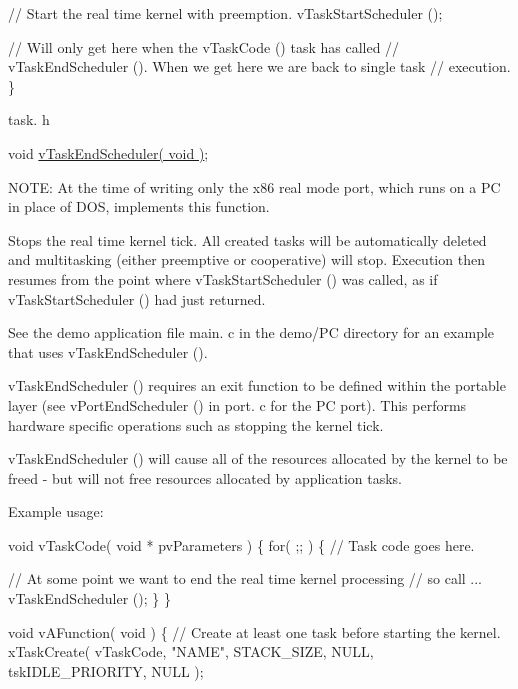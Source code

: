 \begin{DoxyPre}  // Start the real time kernel with preemption.
  vTaskStartScheduler ();\end{DoxyPre}



\begin{DoxyPre}  // Will only get here when the vTaskCode () task has called
  // vTaskEndScheduler ().  When we get here we are back to single task
  // execution.
\}
\end{DoxyPre}


task. h 
\begin{DoxyPre}void \hyperlink{externals_2freertos_2include_2task_8h_a1651e13c7ccd6273f53a62425ec79a15}{vTaskEndScheduler( void )};\end{DoxyPre}


N\+O\+TE\+: At the time of writing only the x86 real mode port, which runs on a PC in place of D\+OS, implements this function.

Stops the real time kernel tick. All created tasks will be automatically deleted and multitasking (either preemptive or cooperative) will stop. Execution then resumes from the point where v\+Task\+Start\+Scheduler () was called, as if v\+Task\+Start\+Scheduler () had just returned.

See the demo application file main. c in the demo/\+PC directory for an example that uses v\+Task\+End\+Scheduler ().

v\+Task\+End\+Scheduler () requires an exit function to be defined within the portable layer (see v\+Port\+End\+Scheduler () in port. c for the PC port). This performs hardware specific operations such as stopping the kernel tick.

v\+Task\+End\+Scheduler () will cause all of the resources allocated by the kernel to be freed -\/ but will not free resources allocated by application tasks.

Example usage\+: 
\begin{DoxyPre}
void vTaskCode( void * pvParameters )
\{
    for( ;; )
    \{
     // Task code goes here.\end{DoxyPre}



\begin{DoxyPre}     // At some point we want to end the real time kernel processing
     // so call ...
     vTaskEndScheduler ();
    \}
\}\end{DoxyPre}



\begin{DoxyPre}void vAFunction( void )
\{
    // Create at least one task before starting the kernel.
    xTaskCreate( vTaskCode, "NAME", STACK\_SIZE, NULL, tskIDLE\_PRIORITY, NULL );\end{DoxyPre}



